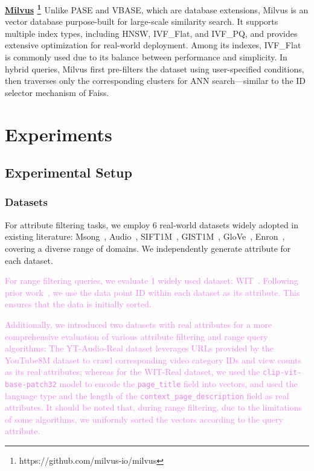 \documentclass[sigconf, nonacm]{acmart}
\begin{document}
	\noindent\textbf{\underline{Milvus} \footnote{https://github.com/milvus-io/milvus} \cite{milvus}}
	Unlike PASE and VBASE, which are database extensions, Milvus is an vector database purpose-built for large-scale similarity search. It supports multiple index types, including HNSW, IVF\_Flat, and IVF\_PQ, and provides extensive optimization for real-world deployment. Among its indexes, IVF\_Flat is commonly used due to its balance between performance and simplicity. In hybrid queries, Milvus first pre-filters the dataset using user-specified conditions, then traverses only the corresponding clusters for ANN search—similar to the ID selector mechanism of Faiss.
	
	\section{Experiments}
	\subsection{Experimental Setup}
	\subsubsection{Datasets}
	For attribute filtering tasks, we employ 6 real-world datasets widely adopted in existing literature: Msong~\cite{msong2011}, Audio~\cite{audio_unknown}, SIFT1M~\cite{sift2010}, GIST1M~\cite{sift2010}, GloVe~\cite{GloVe2015}, Enron~\cite{enron2015}, covering a diverse range of domains. We independently generate attribute for each dataset.
	
	\textcolor{violet}{For range filtering queries, we evaluate 1 widely used dataset: WIT~\cite{wit_dataset}. Following prior work~\cite{DSG}, we use the data point ID within each dataset as its attribute. This ensures that the data is initially sorted.}
	
	\textcolor{violet}{Additionally, we introduced two datasets with real attributes for a more comprehensive evaluation of various attribute filtering and range query algorithms: The YT-Audio-Real dataset leverages URLs provided by the YouTube8M dataset to crawl corresponding video category IDs and view counts as its real attributes; whereas for the WIT-Real dataset, we used the \texttt{clip-vit-base-patch32} model to encode the \texttt{page\_title} field into vectors, and used the language type and the length of the \texttt{context\_page\_description} field as real attributes. It should be noted that, during range filtering, due to the limitations of some algorithms, we uniformly sorted the vectors according to the query attribute.}
	
\end{document}
